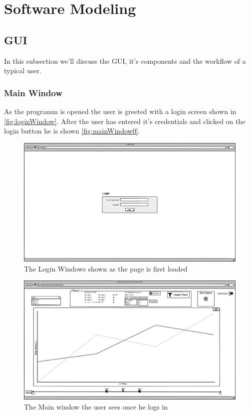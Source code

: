 \documentclass[twoside, english, final]{Pflichtenheft}
\begin{document}
\section{Software Modeling}



\subsection{GUI}
In this subsection we'll discuss the GUI, it's components and the workflow of a typical user.
\subsubsection{Main Window}
As the programm is opened the user is greeted with a login screen shown in \autoref{fig:loginWindow}. After the user has entered it's credentials and clicked on the login button he is shown \autoref{fig:mainWindow0}.
\\
\vfill

\begin{figure}[h]
	\centering
	\includegraphics[width=\textwidth]{Images/01MWL.png}
	\caption{The Login Windows shown as the page is first loaded}
	\label{fig:loginWindow}
\end{figure}


\begin{figure}[ht]
	\centering
	\includegraphics[width=\textwidth]{Images/02MW.png}
	\caption{The Main window the user sees once he logs in}
	\label{fig:mainWindow0}
\end{figure}
\vfill
\clearpage
\end{document}
